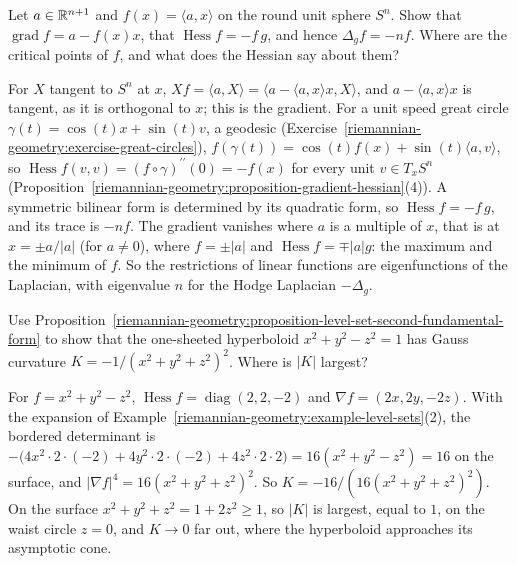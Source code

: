 \begin{exercise}\label{riemannian-geometry:exercise-height-sphere}
Let $a \in \mathbb{R}^{n+1}$ and $f(x) = \langle a, x\rangle$ on the round unit sphere $S^n$. Show that $\operatorname{grad}f = a - f(x)x$, that $\operatorname{Hess}f = -f\,g$, and hence $\Delta_gf = -nf$. Where are the
critical points of $f$, and what does the Hessian say about them?
\end{exercise}

\begin{solution}
For $X$ tangent to $S^n$ at $x$, $Xf = \langle a, X\rangle = \langle a - \langle a, x\rangle x, X\rangle$, and $a - \langle a, x\rangle x$ is tangent, as it is orthogonal to $x$; this is the gradient. For a unit speed great
circle $\gamma(t) = \cos(t)x + \sin(t)v$, a geodesic (Exercise~\ref{riemannian-geometry:exercise-great-circles}), $f(\gamma(t)) = \cos(t)f(x) + \sin(t)\langle a, v\rangle$, so
$\operatorname{Hess}f(v, v) = (f \circ \gamma)^{\prime\prime}(0) = -f(x)$ for every unit $v \in T_xS^n$ (Proposition~\ref{riemannian-geometry:proposition-gradient-hessian}(4)). A symmetric bilinear form is determined by its
quadratic form, so $\operatorname{Hess}f = -f\,g$, and its trace is $-nf$. The gradient vanishes where $a$ is a multiple of $x$, that is at $x = \pm a/|a|$ (for $a \neq 0$), where $f = \pm|a|$ and
$\operatorname{Hess}f = \mp|a|g$: the maximum and the minimum of $f$. So the restrictions of linear functions are eigenfunctions of the Laplacian, with eigenvalue $n$ for the Hodge Laplacian $-\Delta_g$.
\end{solution}

\begin{exercise}\label{riemannian-geometry:exercise-hyperboloid-curvature}
Use Proposition~\ref{riemannian-geometry:proposition-level-set-second-fundamental-form} to show that the one-sheeted hyperboloid $x^2 + y^2 - z^2 = 1$ has Gauss curvature $K = -1/(x^2 + y^2 + z^2)^2$. Where is $|K|$
largest?
\end{exercise}

\begin{solution}
For $f = x^2 + y^2 - z^2$, $\operatorname{Hess}f = \operatorname{diag}(2, 2, -2)$ and $\nabla f = (2x, 2y, -2z)$. With the expansion of Example~\ref{riemannian-geometry:example-level-sets}(2), the bordered determinant is
$-\bigl(4x^2 \cdot 2 \cdot (-2) + 4y^2 \cdot 2 \cdot (-2) + 4z^2 \cdot 2 \cdot 2\bigr) = 16(x^2 + y^2 - z^2) = 16$ on the surface, and $|\nabla f|^4 = 16(x^2 + y^2 + z^2)^2$. So
$K = -16/(16(x^2 + y^2 + z^2)^2)$. On the surface $x^2 + y^2 + z^2 = 1 + 2z^2 \geq 1$, so $|K|$ is largest, equal to $1$, on the waist circle $z = 0$, and $K \to 0$ far out, where the hyperboloid approaches its
asymptotic cone.
\end{solution}

